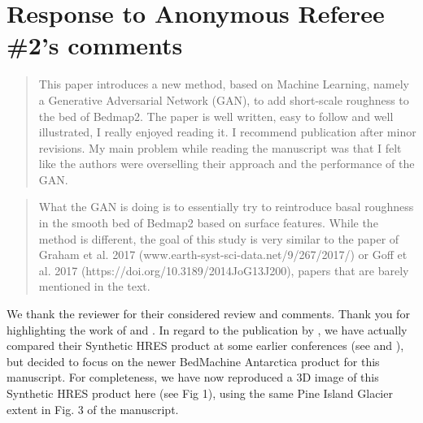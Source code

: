 \documentclass{article}
\begin{document}

\section*{Response to Anonymous Referee \#2's comments}


\begin{quote}
\color{blue}
  This paper introduces a new method, based on Machine Learning, namely a Generative Adversarial Network (GAN), to add short-scale roughness to the bed of Bedmap2.
  The paper is well written, easy to follow and well illustrated, I really enjoyed reading it.
  I recommend publication after minor revisions.
  My main problem while reading the manuscript was that I felt like the authors were overselling their approach and the performance of the GAN.
\end{quote}

\begin{quote}
\color{blue}
  What the GAN is doing is to essentially try to reintroduce basal roughness in the smooth bed of Bedmap2 based on surface features.
  While the method is different, the goal of this study is very similar to the paper of Graham et al. 2017 (www.earth-syst-sci-data.net/9/267/2017/) or Goff et al. 2017 (https://doi.org/10.3189/2014JoG13J200), papers that are barely mentioned in the text.
\end{quote}

We thank the reviewer for their considered review and comments.
Thank you for highlighting the work of \citet{GoffConditionalsimulationThwaites2014} and \citet{Grahamhighresolutionsyntheticbed2017}.
In regard to the publication by \citet{Grahamhighresolutionsyntheticbed2017}, we have actually compared their Synthetic HRES product at some earlier conferences (see \citet{LeongDeepBedMapUsingdeep2019} and \citet{LeongDeepBedMapsuperresolutiondeep2019}), but decided to focus on the newer BedMachine Antarctica product for this manuscript.
For completeness, we have now reproduced a 3D image of this Synthetic HRES product here (see Fig 1), using the same Pine Island Glacier extent in Fig. 3 of the manuscript.

\iffalse
\begin{figure}[htbp]
  \texttt{[image: figure-1\_qualitative\_bed\_comparison.png]}
  \caption{
    Comparison of interpolated bed elevation grid products over Pine Island Glacier.
    a) DeepBedMap (ours) at 250 m resolution.
    b) BEDMAP2.
    c) Synthetic HRES product.
    d) BedMachine Antarctica.
  }
  \label{fig:1}
\end{figure}
\fi
\end{document}
